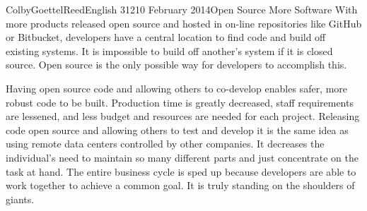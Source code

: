\documentclass[12pt]{article}
\begin{document}
\begin{mla}{Colby}{Goettel}{Reed}{English 312}{10 February 2014}{Open Source More Software}
With more products released open source and hosted in on-line repositories like GitHub or Bitbucket, developers have a central location to find code and build off existing systems. It is impossible to build off another's system if it is closed source. Open source is the only possible way for developers to accomplish this.

Having open source code and allowing others to co-develop enables safer, more robust code to be built. Production time is greatly decreased, staff requirements are lessened, and less budget and resources are needed for each project. Releasing code open source and allowing others to test and develop it is the same idea as using remote data centers controlled by other companies. It decreases the individual's need to maintain so many different parts and just concentrate on the task at hand. The entire business cycle is sped up because developers are able to work together to achieve a common goal. It is truly standing on the shoulders of giants.

\end{mla}
\end{document}
